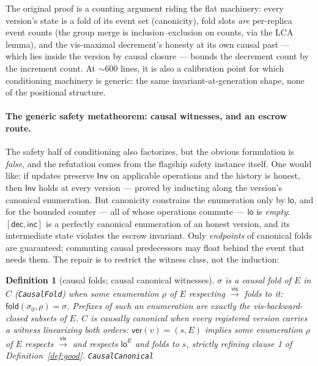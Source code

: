 \documentclass[11pt]{article}
\newtheorem{definition}[theorem]{Definition}
\newcommand{\vis}{\xrightarrow{\mathsf{vis}}}
\newcommand{\Sinit}{\sigma_0}
\newcommand{\loE}[1]{\mathsf{lo}^{#1}}
\newcommand{\lean}[1]{\texttt{#1}}
\newcommand{\fold}{\mathsf{fold}}
\newcommand{\Inv}{\mathsf{Inv}}
\begin{document}
The original proof is a
counting argument riding the flat machinery: every version's state is a fold
of its event set (canonicity), fold slots \emph{are} per-replica event
counts (the group merge is inclusion--exclusion on counts, via the LCA
lemma), and the vis-maximal decrement's honesty at its own causal past ---
which lies inside the version by causal closure --- bounds the decrement
count by the increment count. At ${\sim}600$ lines, it is also a
calibration point for which conditioning machinery is generic: the same
invariant-at-generation shape, none of the positional structure.

\paragraph{The generic safety metatheorem: causal witnesses, and an
escrow route.} The safety half of conditioning also factorizes, but the
obvious formulation is \emph{false}, and the refutation comes from the
flagship safety instance itself. One would like: if updates preserve
$\Inv$ on applicable operations and the history is honest, then $\Inv$
holds at every version --- proved by inducting along the version's
canonical enumeration. But canonicity constrains the enumeration only by
$\mathsf{lo}$, and for the bounded counter --- all of whose operations
commute --- $\mathsf{lo}$ is \emph{empty}: $[\mathsf{dec}, \mathsf{inc}]$
is a perfectly canonical enumeration of an honest version, and its
intermediate state violates the escrow invariant. Only \emph{endpoints}
of canonical folds are guaranteed; commuting causal predecessors may
float behind the event that needs them. The repair is to restrict the
witness class, not the induction:

\begin{definition}[causal folds; causal canonical witnesses]
\label{def:causalcanon}
$\sigma$ is a \emph{causal fold} of $E$ in $C$ (\lean{CausalFold}) when some
enumeration $\rho$ of $E$ respecting $\vis$ folds to it:
$\fold(\Sinit, \rho) = \sigma$. Prefixes of such an enumeration are exactly the
vis-backward-closed subsets of $E$. $C$ is \emph{causally canonical} when every
registered version carries a witness linearizing both orders:
$\mathsf{ver}(v) = (s, E)$ implies some enumeration $\rho$ of $E$ respects $\vis$
\emph{and} respects $\loE{E}$ and folds to $s$, strictly refining clause 1 of
Definition~\ref{def:good}.
\hfill\lean{CausalCanonical}
\end{definition}
\end{document}
